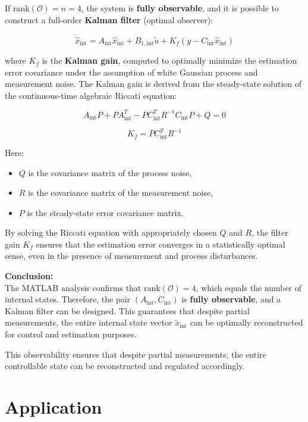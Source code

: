 \documentclass[]{report}
\begin{document}
If $\text{rank}(\mathcal{O}) = n = 4$, the system is \textbf{fully observable}, and it is possible to construct a full-order \textbf{Kalman filter} (optimal observer):

\[
\dot{\hat{x}}_{\text{int}} = A_{\text{int}} \hat{x}_{\text{int}} + B_{1,\text{int}} \tilde{u} + K_f(y - C_{\text{int}} \hat{x}_{\text{int}})
\]

where $K_f$ is the \textbf{Kalman gain}, computed to optimally minimize the estimation error covariance under the assumption of white Gaussian process and measurement noise. The Kalman gain is derived from the steady-state solution of the continuous-time algebraic Riccati equation:

\[
A_{\text{int}} P + P A_{\text{int}}^T - P C_{\text{int}}^T R^{-1} C_{\text{int}} P + Q = 0
\]

\[
K_f = P C_{\text{int}}^T R^{-1}
\]

Here:
\begin{itemize}
	\item $Q$ is the covariance matrix of the process noise,
	\item $R$ is the covariance matrix of the measurement noise,
	\item $P$ is the steady-state error covariance matrix.
\end{itemize}

By solving the Riccati equation with appropriately chosen $Q$ and $R$, the filter gain $K_f$ ensures that the estimation error converges in a statistically optimal sense, even in the presence of measurement and process disturbances.



\textbf{Conclusion:} \\
The MATLAB analysis confirms that $\text{rank}(\mathcal{O}) = 4$, which equals the number of internal states. Therefore, the pair $(A_{\text{int}}, C_{\text{int}})$ is \textbf{fully observable}, and a Kalman filter can be designed. This guarantees that despite partial measurements, the entire internal state vector $\tilde{x}_{\text{int}}$ can be optimally reconstructed for control and estimation purposes.



This observability ensures that despite partial measurements, the entire controllable state can be reconstructed and regulated accordingly.




\chapter{Application}
\end{document}
